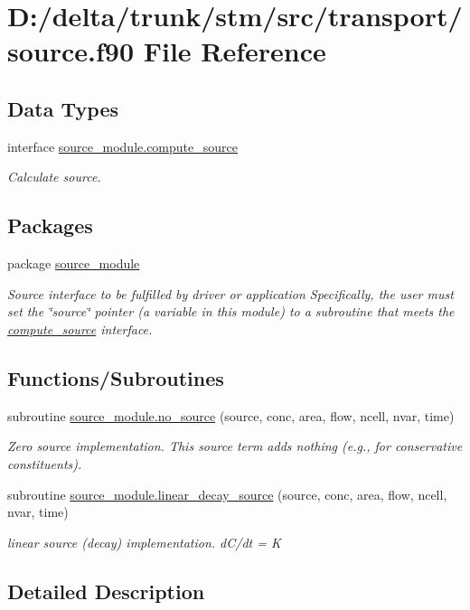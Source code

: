 \hypertarget{a00018}{
\section{D:/delta/trunk/stm/src/transport/source.f90 File Reference}
\label{a00018}
}
\subsection*{Data Types}
\begin{CompactItemize}
\item 
interface \hyperlink{a00001}{source\_\-module.compute\_\-source}
\begin{CompactList}\small\item\em Calculate source. \item\end{CompactList}\end{CompactItemize}
\subsection*{Packages}
\begin{CompactItemize}
\item 
package \hyperlink{a00065}{source\_\-module}
\begin{CompactList}\small\item\em Source interface to be fulfilled by driver or application Specifically, the user must set the \char`\"{}source\char`\"{} pointer (a variable in this module) to a subroutine that meets the \hyperlink{a00001}{compute\_\-source} interface. \item\end{CompactList}

\end{CompactItemize}
\subsection*{Functions/Subroutines}
\begin{CompactItemize}
\item 
subroutine \hyperlink{a00065_e608c06c729047268f62b8d3a15eec2b}{source\_\-module.no\_\-source} (source, conc, area, flow, ncell, nvar, time)
\begin{CompactList}\small\item\em Zero source implementation. This source term adds nothing (e.g., for conservative constituents). \item\end{CompactList}\item 
subroutine \hyperlink{a00065_48ea3b4a3d61af2fbf974185fad9d5ce}{source\_\-module.linear\_\-decay\_\-source} (source, conc, area, flow, ncell, nvar, time)
\begin{CompactList}\small\item\em linear source (decay) implementation. dC/dt = K \item\end{CompactList}\end{CompactItemize}


\subsection{Detailed Description}
